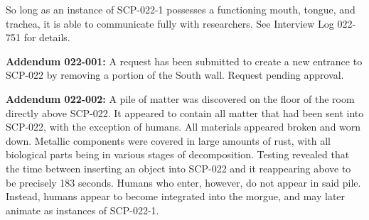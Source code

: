 So long as an instance of SCP-022-1 possesses a functioning mouth, tongue, and trachea, it is able to communicate fully with researchers. See Interview Log 022-751 for details.

\textbf{Addendum 022-001:} A request has been submitted to create a new entrance to SCP-022 by removing a portion of the South wall. Request pending approval.

\textbf{Addendum 022-002:} A pile of matter was discovered on the floor of the room directly above SCP-022. It appeared to contain all matter that had been sent into SCP-022, with the exception of humans. All materials appeared broken and worn down. Metallic components were covered in large amounts of rust, with all biological parts being in various stages of decomposition. Testing revealed that the time between inserting an object into SCP-022 and it reappearing above to be precisely 183 seconds. Humans who enter, however, do not appear in said pile. Instead, humans appear to become integrated into the morgue, and may later animate as instances of SCP-022-1.